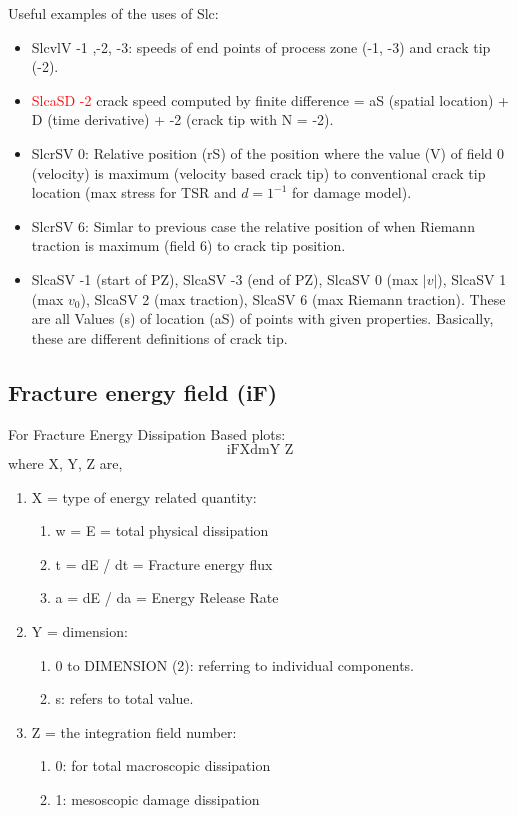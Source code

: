 \documentclass[10pt]{article}
\begin{document}
Useful examples of the uses of Slc:
\begin{itemize}
\item SlcvlV -1 ,-2, -3: speeds of end points of process zone (-1, -3) and crack tip (-2).
\item \textcolor{red}{SlcaSD	-2} crack speed computed by finite difference = aS (spatial location) + D (time derivative) + -2 (crack tip with N = -2).
\item SlcrSV	0: Relative position (rS) of the position where the value (V) of field 0 (velocity) is maximum (velocity based crack tip) to conventional crack tip location (max stress for TSR and $d = 1^{-1}$ for damage model).
\item SlcrSV	6: Simlar to previous case the relative position of when Riemann traction is maximum (field 6) to crack tip position. 
\item SlcaSV	-1 (start of PZ), SlcaSV	-3 (end of PZ), SlcaSV	0 (max $|v|$), SlcaSV	1 (max $v_0$), SlcaSV	2 (max traction), SlcaSV	6 (max Riemann traction). These are all Values (s) of location (aS) of points with given properties. Basically, these are different definitions of crack tip.
\end{itemize}

\subsection{Fracture energy field (iF)} \label{sec:Fracture energy}
For Fracture Energy Dissipation Based plots:
\begin{equation}
\text{iFXdmY	Z}
\end{equation}
	where X, Y, Z are,
\begin{enumerate}
\item X = type of energy related quantity:
	\begin{enumerate}	
	\item w = 	E = total physical dissipation
	\item t	= dE / dt = Fracture energy flux
	\item a = dE / da = Energy Release Rate
	\end{enumerate}
\item Y = dimension:
	\begin{enumerate}
	\item 0 to DIMENSION (2): referring to individual components.
	\item s: refers to total value.
	\end{enumerate}
\item Z = the integration field number:
	\begin{enumerate}
	\item 0: for total macroscopic dissipation
	\item 1: mesoscopic damage dissipation
\end{enumerate}
\end{enumerate}
\end{document}
